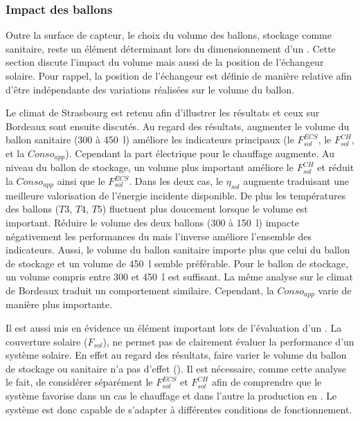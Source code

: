 \subsubsection{Impact des ballons} %
\label{ssub:impact_des_ballons}
Outre la surface de capteur, le choix du volume des ballons, stockage comme sanitaire,
reste un élément déterminant lors du dimensionnement d’un . Cette section discute
l’impact du volume mais aussi de la position de l’échangeur solaire. Pour rappel, la
position de l’échangeur est définie de manière relative afin d’être indépendante des
variations réalisées sur le volume du ballon.

Le climat de Strasbourg est retenu afin d’illustrer les résultats et ceux sur Bordeaux
sont ensuite discutés. Au regard des résultats, augmenter le volume du ballon sanitaire
(\num{300} à \SI{450}{\litre}) améliore les indicateurs principaux (le $F_{sol}^{ECS}$, le
$F_{sol}^{CH}$, et la $Conso_{app}$). Cependant la part électrique pour le chauffage
augmente. Au niveau du ballon de stockage, un volume plus important améliore le $F_{sol}^{CH}$
et réduit la $Conso_{app}$ ainsi que le $F_{sol}^{ECS}$. Dans les deux cas, le $\eta_{sol}$
augmente traduisant une meilleure valorisation de l’énergie incidente disponible.
De plus les températures des ballons ($T3$, $T4$, $T5$) fluctuent plus doucement lorsque le
volume est important. Réduire le volume des deux ballons (\num{300} à \SI{150}{\litre})
impacte négativement les performances du  mais l’inverse améliore l’ensemble des
indicateurs. Aussi, le volume du ballon sanitaire importe plus que celui du ballon de
stockage et un volume de \SI{450}{\litre} semble préférable. Pour le ballon de stockage,
un volume compris entre \num{300} et \SI{450}{\litre} est suffisant. La même analyse sur
le climat de Bordeaux traduit un comportement similaire. Cependant, la $Conso_{app}$
varie de manière plus importante.

Il est aussi mis en évidence un élément important lors de l’évaluation d’un . La
couverture solaire ($F_{sol}$), ne permet pas de clairement évaluer la performance d’un
système solaire. En effet au regard des résultats, faire varier le volume du ballon de
stockage ou sanitaire n’a pas d’effet (). Il est
nécessaire, comme cette analyse le fait, de considérer séparément le $F_{sol}^{ECS}$ et
$F_{sol}^{CH}$ afin de comprendre que le système favorise dans un cas le chauffage et dans
l’autre la production en . Le système est donc capable de s’adapter à
différentes conditions de fonctionnement.

